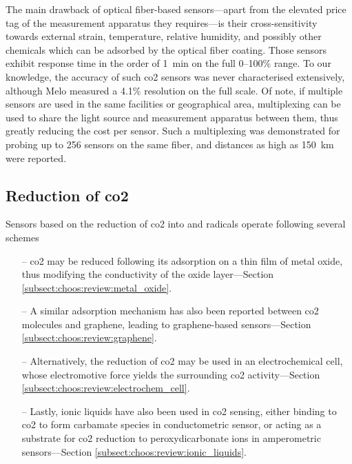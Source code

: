 The main drawback of optical fiber-based sensors---apart from the elevated price tag of the measurement apparatus they requires---is their cross-sensitivity towards external strain, temperature, relative humidity, and possibly other chemicals which can be adsorbed by the optical fiber coating. Those sensors exhibit response time in the order of 1~min on the full 0--100\% range\cite{barrington2018, chong2015}. To our knowledge, the accuracy of such \gls{co2} sensors was never characterised extensively, although Melo \etal{}\cite{melo2014} measured a 4.1\% resolution on the full scale. Of note, if multiple sensors are used in the same facilities or geographical area, multiplexing can be used to share the light source and measurement apparatus between them, thus greatly reducing the cost per sensor\cite{kersey1993}. Such a multiplexing was demonstrated for probing up to 256 sensors on the same fiber, and distances as high as 150~km were reported\cite{perezherrera2013}.


\subsection{Reduction of \texorpdfstring{\gls{co2}}{CO2}}\label{subsect:choos:review:reduction}

Sensors based on the reduction of \gls{co2} into  and  radicals operate following several schemes
\begin{itemize}
	\item[--] \gls{co2} may be reduced following its adsorption on a thin film of metal oxide, thus modifying the conductivity of the oxide layer---Section \ref{subsect:choos:review:metal_oxide}.
	\item[--] A similar adsorption mechanism has also been reported between \gls{co2} molecules and gra\-phene, leading to graphene-based sensors---Section \ref{subsect:choos:review:graphene}.
	\item[--] Alternatively, the reduction of \gls{co2} may be used in an electrochemical cell, whose electromotive force yields the surrounding \gls{co2} activity---Section \ref{subsect:choos:review:electrochem_cell}.
	\item[--] Lastly, ionic liquids have also been used in \gls{co2} sensing, either binding to \gls{co2} to form carbamate species in conductometric sensor, or acting as a substrate for \gls{co2} reduction to peroxydicarbonate ions in amperometric sensors---Section \ref{subsect:choos:review:ionic_liquids}.
\end{itemize}

